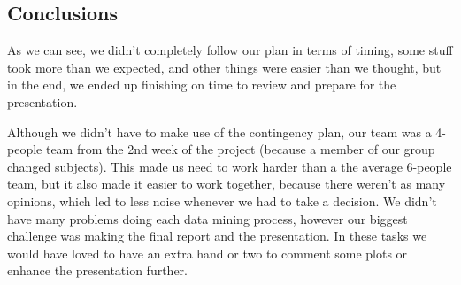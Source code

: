 



 




\pagebreak
\subsection{Conclusions}
As we can see, we didn't completely follow our plan in terms of timing, some stuff took more than we expected, and other things were easier than we thought, but in the end, we ended up finishing on time to review and prepare for the presentation.

Although we didn't have to make use of the contingency plan, our team was a 4-people team from the 2nd week of the project (because a member of our group changed subjects). This made us need to work harder than a the average 6-people team, but it also made it easier to work together, because there weren't as many opinions, which led to less noise whenever we had to take a decision. We didn't have many problems doing each data mining process, however our biggest challenge was making the final report and the presentation. In these tasks we would have loved to have an extra hand or two to comment some plots or enhance the presentation further.

